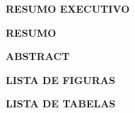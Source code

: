 \documentclass[
	12pt,				%
	openright,			%
	oneside,			%
	a4paper,			%
	chapter=TITLE,		%
	english,			%
	french,				%
	spanish,			%
	brazil				%
]{abnt/abntex2itv_report}
\begin{document}
\frenchspacing %

\imprimircapa

\imprimircatalografica %


\ABNTEXchapterfont\large\textbf{RESUMO EXECUTIVO}

\begin{flushleft}
	
\normalsize
\justify
\normalfont

\lipsum[2] %

\end{flushleft}
\clearpage


\ABNTEXchapterfont\large\textbf{RESUMO}
\begin{flushleft}
    \normalsize
    \justify
    \normalfont

	
	\lipsum[2] %
	
\end{flushleft}
\vspace*{1cm}
\ABNTEXchapterfont\large\textbf{ABSTRACT}
\begin{flushleft}
	\normalsize
	\justify
	\normalfont
	
	
	\lipsum[2] %
	
\end{flushleft}
\clearpage



\begin{flushleft}
\ABNTEXchapterfont\Large\textbf{LISTA DE FIGURAS}
\end{flushleft}
\vspace*{-36pt}
\listoffigures*
\cleardoublepage



\begin{flushleft}
\ABNTEXchapterfont\Large\textbf{LISTA DE TABELAS}
\end{flushleft}
\vspace*{-36pt}
\listoftables*
\cleardoublepage


%
\end{document}
